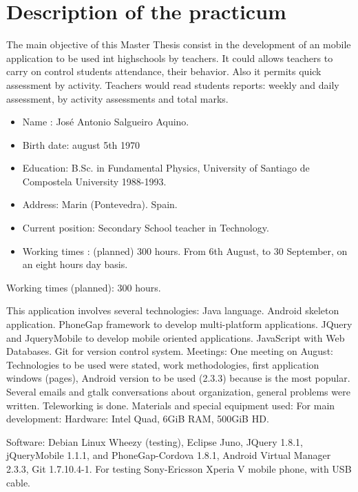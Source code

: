 \chapter{Description of the practicum}
The main objective of this Master Thesis consist in the development of an mobile application to be used int highschools by teachers.
It could allows teachers to carry on control students attendance, their behavior. Also it permits quick assessment by activity.
Teachers would read students reports: weekly and daily assessment, by activity assessments and total marks.
\begin{itemize}
  \item {Name :} Jos\'e Antonio Salgueiro Aquino.
  \item {Birth date: } august 5th 1970
\item {Education:} B.Sc. in Fundamental Physics, University of Santiago de Compostela University 1988-1993.
\item {Address:} Marin (Pontevedra). Spain.
\item {Current position: } Secondary School teacher in Technology.
\end{itemize}

\begin{itemize}
  \item {Working times :} (planned) 300 hours. 	From 6th August, to 30 September, on an eight hours day basis.
\end{itemize}
Working times (planned): 300 hours.

This application involves several technologies:
Java language.
Android skeleton application.
PhoneGap framework to develop multi-platform applications.
JQuery and JqueryMobile  to develop mobile oriented applications.
JavaScript with Web Databases.
Git for version control system.
Meetings:
	One meeting on August: Technologies to be used were stated, work methodologies, first application windows (pages), Android version to be used (2.3.3) because is the most popular. 
	Several emails and gtalk conversations about organization, general problems were written.
Teleworking is done. 
Materials and special equipment used:
	For main development: 
Hardware: Intel Quad, 6GiB RAM, 500GiB HD. 

Software: Debian Linux Wheezy (testing), Eclipse Juno, JQuery 1.8.1, jQueryMobile 1.1.1, and PhoneGap-Cordova 1.8.1, Android Virtual Manager 2.3.3, Git 1.7.10.4-1.
For testing Sony-Ericsson Xperia V mobile phone, with USB cable.
    
    
